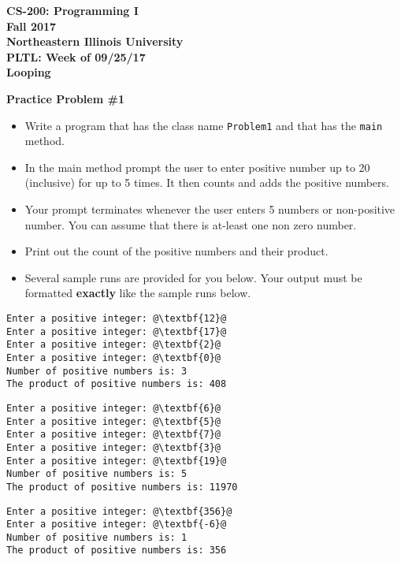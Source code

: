 \documentclass[12pt]{article}
\begin{document}
\begin{center}
	\textbf{CS-200: Programming I}\\
	\textbf{Fall 2017}\\
	\textbf{Northeastern Illinois University}\\
	\textbf{PLTL: Week of 09/25/17}\\
	\textbf{Looping}
\end{center}


\noindent\textbf{Practice Problem \#1}
\begin{itemize}
	\item Write a program that has the class name \texttt{Problem1} and that has the \texttt{main} method.
	\item In the main method prompt the user to enter positive number up to 20 (inclusive) for up to 5 times. It then counts and adds the positive numbers. 
	\item Your prompt terminates whenever the user enters 5 numbers or non-positive number. You can assume that there is at-least one non zero number.
	\item Print out the count of the positive numbers and their product.
	\item Several sample runs are provided for you below. Your output must be formatted \textbf{exactly} like the sample runs below.
\end{itemize}
\begin{center}
\begin{minipage}{7cm}
\begin{lstlisting}[escapechar=@]
Enter a positive integer: @\textbf{12}@
Enter a positive integer: @\textbf{17}@
Enter a positive integer: @\textbf{2}@
Enter a positive integer: @\textbf{0}@
Number of positive numbers is: 3
The product of positive numbers is: 408
\end{lstlisting}
\end{minipage}
\hspace*{0.5cm}
\begin{minipage}{7cm}
\begin{lstlisting}[escapechar=@]
Enter a positive integer: @\textbf{6}@
Enter a positive integer: @\textbf{5}@
Enter a positive integer: @\textbf{7}@
Enter a positive integer: @\textbf{3}@
Enter a positive integer: @\textbf{19}@
Number of positive numbers is: 5
The product of positive numbers is: 11970
\end{lstlisting}
\end{minipage}
\begin{minipage}{7cm}
\begin{lstlisting}[escapechar=@]
Enter a positive integer: @\textbf{356}@
Enter a positive integer: @\textbf{-6}@
Number of positive numbers is: 1
The product of positive numbers is: 356
\end{lstlisting}
\end{minipage}
\end{center}
\end{document}
